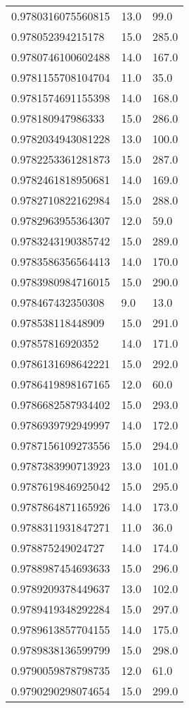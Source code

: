\begin{center}
\begin{supertabular}[H]{p{0.30\textwidth}p{0.05\textwidth}p{0.05\textwidth}}
0.9780316075560815 & 13.0 & 99.0 \\ 
0.978052394215178 & 15.0 & 285.0 \\ 
0.9780746100602488 & 14.0 & 167.0 \\ 
0.9781155708104704 & 11.0 & 35.0 \\ 
0.9781574691155398 & 14.0 & 168.0 \\ 
0.978180947986333 & 15.0 & 286.0 \\ 
0.9782034943081228 & 13.0 & 100.0 \\ 
0.9782253361281873 & 15.0 & 287.0 \\ 
0.9782461818950681 & 14.0 & 169.0 \\ 
0.9782710822162984 & 15.0 & 288.0 \\ 
0.9782963955364307 & 12.0 & 59.0 \\ 
0.9783243190385742 & 15.0 & 289.0 \\ 
0.9783586356564413 & 14.0 & 170.0 \\ 
0.9783980984716015 & 15.0 & 290.0 \\ 
0.978467432350308 & 9.0 & 13.0 \\ 
0.978538118448909 & 15.0 & 291.0 \\ 
0.97857816920352 & 14.0 & 171.0 \\ 
0.9786131698642221 & 15.0 & 292.0 \\ 
0.9786419898167165 & 12.0 & 60.0 \\ 
0.9786682587934402 & 15.0 & 293.0 \\ 
0.9786939792949997 & 14.0 & 172.0 \\ 
0.9787156109273556 & 15.0 & 294.0 \\ 
0.9787383990713923 & 13.0 & 101.0 \\ 
0.9787619846925042 & 15.0 & 295.0 \\ 
0.9787864871165926 & 14.0 & 173.0 \\ 
0.9788311931847271 & 11.0 & 36.0 \\ 
0.978875249024727 & 14.0 & 174.0 \\ 
0.9788987454693633 & 15.0 & 296.0 \\ 
0.9789209378449637 & 13.0 & 102.0 \\ 
0.9789419348292284 & 15.0 & 297.0 \\ 
0.9789613857704155 & 14.0 & 175.0 \\ 
0.9789838136599799 & 15.0 & 298.0 \\ 
0.9790059878798735 & 12.0 & 61.0 \\ 
0.9790290298074654 & 15.0 & 299.0 \\ 

\end{supertabular}
\end{center}

